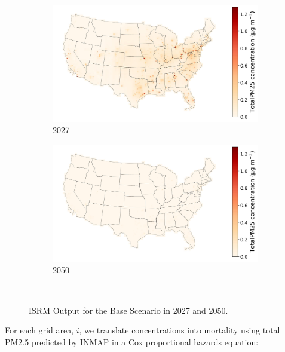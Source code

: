 \documentclass[a4paper]{article}
\theoremstyle{definition}
\theoremstyle{plain}
\begin{document}
\begin{figure}
    \centering
    \begin{subfigure}[b]{0.45\textwidth}
        \includegraphics[width=\textwidth]{Figures/Output/full-base-200/GenX/ISRM_2027_TotalPM25_concentrationmap.jpg}
        \caption{2027}
        \label{Subfig1}
    \end{subfigure}
    \hfill
    \begin{subfigure}[b]{0.45\textwidth}
        \includegraphics[width=\textwidth]{Figures/Output/full-base-200/GenX/ISRM_2050_TotalPM25_concentrationmap.jpg}
        \caption{2050}
        \label{Subfig2}
    \end{subfigure}\\
    \caption{ISRM Output for the Base Scenario in 2027 and 2050.}
\end{figure}
For each grid area, $i$, we translate concentrations into mortality using total PM2.5 predicted by INMAP in a Cox proportional hazards equation:
\end{document}
